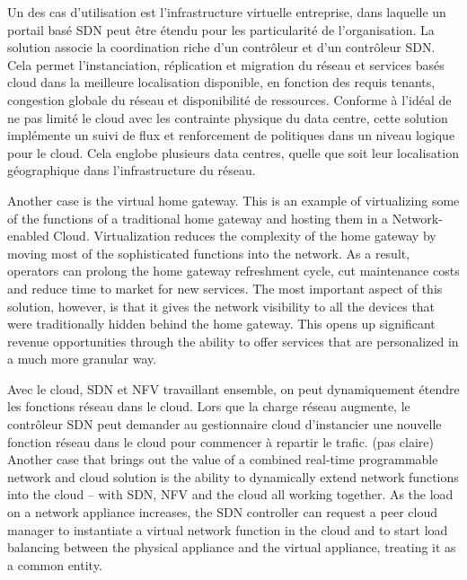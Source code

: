 Un des cas d'utilisation est l'infrastructure virtuelle entreprise, dans laquelle un portail basé SDN peut être étendu pour les particularité de l'organisation. La solution associe la coordination riche d'un contrôleur et d'un contrôleur SDN. Cela permet l'instanciation, réplication et migration du réseau et services basés cloud dans la meilleure localisation disponible, en fonction des requis tenants, congestion globale du réseau et disponibilité de ressources. Conforme à l'idéal de ne pas limité le cloud avec les contrainte physique du data centre,  cette solution implémente un suivi de flux et renforcement de politiques dans un niveau logique pour le cloud. Cela englobe plusieurs data centres, quelle que soit leur localisation géographique dans l'infrastructure du réseau.


Another case is the virtual home gateway. This is an example of virtualizing some of the functions of a traditional home gateway and hosting them in a Network-enabled Cloud. Virtualization reduces the complexity of the home gateway by moving most of the sophisticated functions into the network. As a result, operators can prolong the home gateway refreshment cycle, cut maintenance costs and reduce time to market for new services. The most important aspect of this solution, however, is that it gives the network visibility to all the devices that were traditionally hidden behind the home gateway. This opens up significant revenue opportunities through the ability to offer services that are personalized in a much more granular way.

Avec le cloud, SDN et NFV travaillant ensemble, on peut dynamiquement étendre les fonctions réseau dans le cloud. Lors que la charge réseau augmente, le contrôleur SDN peut demander au gestionnaire cloud d'instancier une nouvelle fonction réseau dans le cloud pour commencer à repartir le trafic. (pas claire)
Another case that brings out the value of a combined real-time programmable network and cloud solution is the ability to dynamically extend network functions into the cloud – with SDN, NFV and the cloud all working together. As the load on a network appliance increases, the SDN controller can request a peer cloud manager to instantiate a virtual network function in the cloud and to start load balancing between the physical appliance and the virtual appliance, treating it as a common entity.

